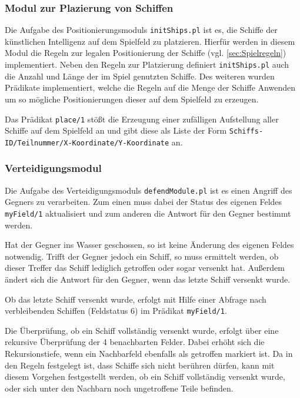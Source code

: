 \subsubsection{Modul zur Plazierung von Schiffen} \label{sec:initships}	
	Die Aufgabe des Positionierungsmoduls \texttt{initShips.pl} ist es, die Schiffe der künstlichen Intelligenz auf dem Spielfeld zu platzieren.
	Hierfür werden in diesem Modul die Regeln zur legalen Positionierung der Schiffe (vgl. \ref{sec:Spielregeln}) implementiert. Neben den Regeln 
	zur Platzierung definiert \texttt{initShips.pl} auch die Anzahl und Länge der im Spiel genutzten Schiffe. Des weiteren wurden Prädikate implementiert, 
	welche die Regeln auf die Menge der Schiffe Anwenden um so mögliche Positionierungen dieser auf dem Spielfeld zu erzeugen.
	
	Das Prädikat \texttt{place/1} stößt die Erzeugung einer zufälligen Aufstellung aller Schiffe auf dem Spielfeld an und gibt diese als Liste der Form 
	\newline \texttt{Schiffs-ID/Teilnummer/X-Koordinate/Y-Koordinate} an. 
	
\subsubsection{Verteidigungsmodul} \label{sec:defendModule}
	Die Aufgabe des Verteidigungsmoduls \texttt{defendModule.pl} ist es einen Angriff des Gegners zu verarbeiten.
	Zum einen muss dabei der Status des eigenen Feldes \texttt{myField/1} aktualisiert 
	und zum anderen die Antwort für den Gegner bestimmt werden.
	
	Hat der Gegner ins Wasser geschossen, so ist keine Änderung des eigenen Feldes notwendig. Trifft der Gegner jedoch ein Schiff,
	so muss ermittelt werden, ob dieser Treffer das Schiff lediglich getroffen oder sogar versenkt hat. Außerdem ändert sich die Antwort
	für den Gegner, wenn das letzte Schiff versenkt wurde.
	
	Ob das letzte Schiff versenkt wurde, erfolgt mit Hilfe einer Abfrage nach verbleibenden Schiffen (Feldstatus 6) im Prädikat \texttt{myField/1}.
	
	Die Überprüfung, ob ein Schiff vollständig versenkt wurde, erfolgt über eine rekursive Überprüfung der 4 benachbarten Felder.
	Dabei erhöht sich die Rekursionstiefe, wenn ein Nachbarfeld ebenfalls als getroffen markiert ist. 
	Da in den Regeln festgelegt ist, dass Schiffe sich nicht berühren dürfen, kann mit diesem Vorgehen festgestellt werden, ob ein Schiff
	vollständig versenkt wurde, oder sich unter den Nachbarn noch ungetroffene Teile befinden.
	

